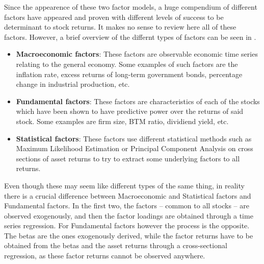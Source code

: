 Since the appearence of these two factor models, a huge compendium of different factors have appeared and proven with different levels of success to be determinant to stock returns. It makes no sense to review here all of these factors. However, a brief overview of the differnt types of factors can be seen in \cite{connor_1995}.
\begin{itemize}
    \item \textbf{Macroeconomic factors}: These factors are observable economic time series relating to the general economy. Some examples of such factors are the inflation rate, excess returns of long-term government bonds, percentage change in industrial production, etc. 
    \item \textbf{Fundamental factors}: These factors are characteristics of each of the stocks which have been shown to have predictive power over the returns of said stock. Some examples are firm size, BTM ratio, dividiend yield, etc. 
    \item \textbf{Statistical factors}: These factors use different statistical methods such as Maximum Likelihood Estimation or Principal Component Analysis on cross sections of asset returns to try to extract some underlying factors to all returns. 
\end{itemize}
Even though these may seem like different types of the same thing, in reality there is a crucial difference between Macroeconomic and Statistical factors and Fundamental factors. In the first two, the factors -- common to all stocks -- are observed exogenously, and then the factor loadings are obtained through a time series regression. For Fundamental factors however the process is the opposite. The betas are the ones exogenously derived, while the factor returns have to be obtained from the betas and the asset returns through a cross-sectional regression, as these factor returns cannot be observed anywhere. 

